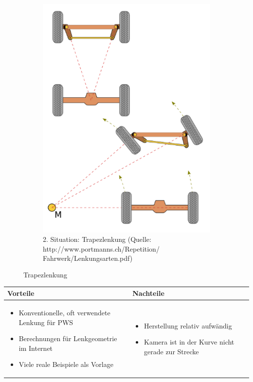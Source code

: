 \begin{figure} [hbp]
\begin{subfigure}[b]{0.36\textwidth}
		\includegraphics[width=\textwidth]{fig/Lenktrapez.png}
		\caption{2. Situation: Trapezlenkung
		(Quelle: http://www.portmanns.ch/Repetition/ \\
		Fahrwerk/Lenkungsarten.pdf)}
\end{subfigure}
	\caption{Trapezlenkung}\label{fig:animals}
\end{figure}

\begin{table}[h]
\begin{tabular}{p{} | p{}}


 \textbf{Vorteile} & \textbf{Nachteile} \\ \hline
	 
\begin{itemize}
\item Konventionelle, oft verwendete Lenkung für PWS
\item Berechnungen für Lenkgeometrie im Internet
\item Viele reale Beispiele als Vorlage
\end{itemize}

 
 &
 
\begin{itemize}
\item Herstellung relativ aufwändig
\item Kamera ist in der Kurve nicht gerade zur Strecke
\end{itemize}

\end{tabular}
\end{table}

